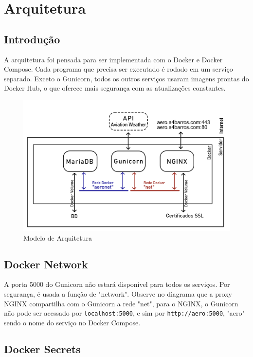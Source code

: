 \chapter{Arquitetura}

\section{Introdução}
A arquitetura foi pensada para ser implementada com o Docker e Docker Compose. Cada
programa que precisa ser executado é rodado em um serviço separado. Exceto o Gunicorn,
todos os outros serviços usaram imagens prontas do Docker Hub, o que oferece mais segurança
com as atualizações constantes.

\begin{figure}[ht]
    \begin{center}
    \includegraphics[width=\linewidth]{img/diagrama-arquitetura.png}
    \caption{Modelo de Arquitetura}
    \label{fig:arquitetura}
    \end{center}
\end{figure}

\section{Docker Network}
A porta 5000 do Gunicorn não estará disponível para todos os serviços. Por segurança, é usada a função de
"network". Observe no diagrama que a proxy NGINX compartilha com o Gunicorn a rede "net", para o NGINX,
o Gunicorn não pode ser acessado por \texttt{localhost:5000}, e sim por \texttt{http://aero:5000}, "aero"
sendo o nome do serviço no Docker Compose.


\section{Docker Secrets}

